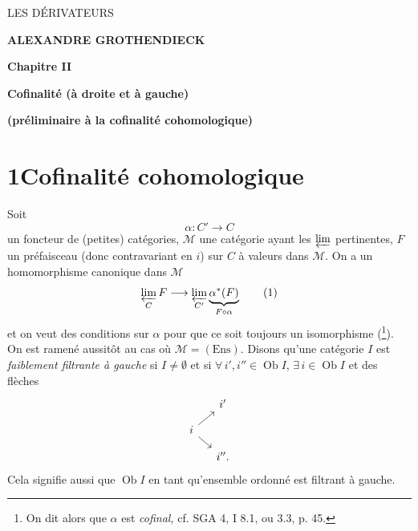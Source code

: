 \documentclass[11pt]{article}
\newcommand{\printedpage}[1]{\marginpar{\footnotesize p.~#1}}
\newcommand{\msp}[1]{\marginpar{\footnotesize [#1]}}
\begin{document}
\printedpage{--}

\begin{center}
\vspace*{4cm}
{\Large\textsf{LES DÉRIVATEURS}}

\bigskip\bigskip

\textbf{ALEXANDRE GROTHENDIECK}

\bigskip\bigskip\bigskip

\textbf{Chapitre II}

\textbf{Cofinalité (à droite et à gauche)}

\textbf{(préliminaire à la cofinalité cohomologique)}
\end{center}

\clearpage

\printedpage{--}

\vspace*{6cm}


\clearpage

\printedpage{1}

\msp{page 1}

\section*{1\quad Cofinalité cohomologique}

Soit
\[ \alpha : C' \longrightarrow C \]
un foncteur de (petites) catégories, $\mathcal{M}$ une catégorie ayant les $\varprojlim$ pertinentes, $F$ un préfaisceau (donc contravariant en $i$) sur $C$ à valeurs dans $\mathcal{M}$. On a un homomorphisme canonique dans $\mathcal{M}$
\[ \varprojlim_{C} F \longrightarrow \varprojlim_{C'} \underbrace{\alpha^*(F)}_{F\circ\alpha} \tag*{(1)} \]
et on veut des conditions sur $\alpha$ pour que ce soit toujours un isomorphisme (\footnote{On dit alors que $\alpha$ est \textit{cofinal,} cf. SGA 4, I 8.1, ou 3.3, p. 45.}). On est ramené aussitôt au cas où $\mathcal{M} = (\mathrm{Ens})$. Disons qu'une catégorie $I$ est \textit{faiblement filtrante à gauche} si $I \neq \emptyset$ et si $\forall\, i', i'' \in \operatorname{Ob} I$, $\exists\, i \in \operatorname{Ob} I$ et des flèches
\[
\begin{tikzcd}[row sep=small, column sep=small]
 & i' \\
i \arrow[ur] \arrow[dr] & \\
 & i''.
\end{tikzcd}
\]
Cela signifie aussi que $\operatorname{Ob} I$ en tant qu'ensemble ordonné est filtrant à gauche.
\end{document}
